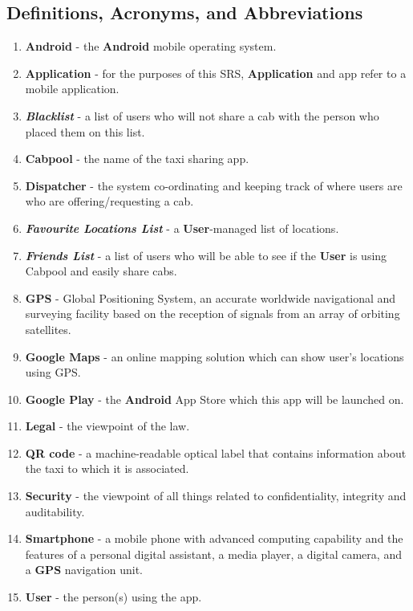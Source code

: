 \documentclass[english]{article}
\begin{document}
\subsection{Definitions, Acronyms, and Abbreviations}
\label{sub:definitions_acronyms_and_abbreviations}
\begin{enumerate}
	\item  \textbf{Android} - the  \textbf{Android} mobile operating system.
	\item \textbf{Application} - for the purposes of this SRS, \textbf{Application} and app refer to a mobile application.
	\item \textbf{\emph{Blacklist}} - a list of users who will not share a cab with the person who placed them on this list.
	\item \textbf{Cabpool} - the name of the taxi sharing app.
	\item \textbf{Dispatcher} - the system co-ordinating and keeping track of where users are who are offering/requesting a cab.
	\item \textbf{\emph{Favourite Locations List}} - a \textbf{User}-managed list of locations.
	\item \textbf{\emph{Friends List}} - a list of users who will be able to see if the \textbf{User} is using Cabpool and easily share cabs.
	\item \textbf{GPS} - Global Positioning System, an accurate worldwide navigational and surveying facility based on the reception of signals from an array of orbiting satellites.
	\item \textbf{Google Maps} - an online mapping solution which can show user's locations using GPS.
	\item \textbf{Google Play} - the  \textbf{Android} App Store which this app will be launched on.
	\item \textbf{Legal} - the viewpoint of the law.
	\item \textbf{QR code} - a machine-readable optical label that contains information about the taxi to which it is associated.
	\item \textbf{Security} - the viewpoint of all things related to confidentiality, integrity and auditability.
	\item \textbf{Smartphone} - a mobile phone with advanced computing capability and the features of a personal digital assistant, a media player, a digital camera, and a \textbf{GPS} navigation unit.
	\item \textbf{User} - the person(s) using the app.
\end{enumerate}
\end{document}
